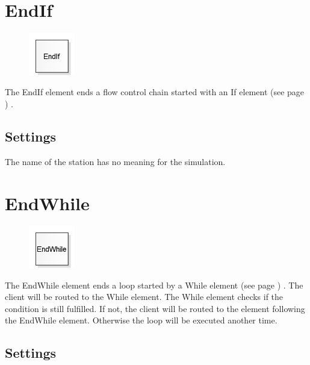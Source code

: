 \section{EndIf}
\label{ref:ModelElementLogicEndIf}

\begin{figure}
\vspace{-22pt}
\includegraphics[width=2cm]{imageModelElementLogicEndIf.png}
\vspace{-22pt}
\end{figure}

The EndIf element ends a flow control chain
started with an
If element (see page \pageref{ref:ModelElementLogicEndIf}) .

\subsection*{Settings}

The name of the station has no meaning for the simulation.


\section{EndWhile}
\label{ref:ModelElementLogicEndWhile}

\begin{figure}
\vspace{-22pt}
\includegraphics[width=2cm]{imageModelElementLogicEndWhile.png}
\vspace{-22pt}
\end{figure}

The EndWhile element ends a loop started by a
While element (see page \pageref{ref:ModelElementLogicWhile}) .
The client will be routed to the While element.
The While element checks if the condition is still
fulfilled. If not, the client will be routed to the
element following the EndWhile element. Otherwise
the loop will be executed another time.

\subsection*{Settings}

